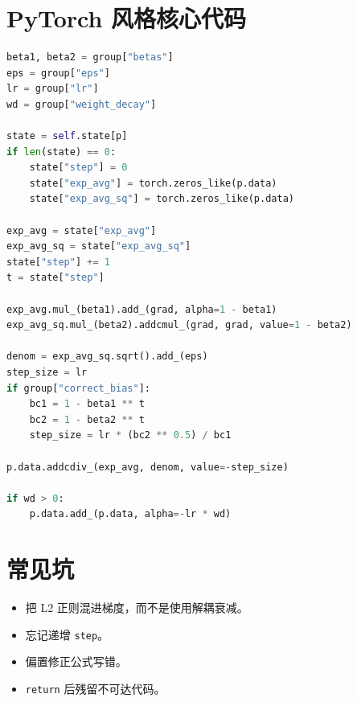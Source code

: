 \documentclass[11pt]{article}
\begin{document}
\section{PyTorch 风格核心代码}
\begin{lstlisting}[language=Python,basicstyle=\ttfamily\small]
beta1, beta2 = group["betas"]
eps = group["eps"]
lr = group["lr"]
wd = group["weight_decay"]

state = self.state[p]
if len(state) == 0:
    state["step"] = 0
    state["exp_avg"] = torch.zeros_like(p.data)
    state["exp_avg_sq"] = torch.zeros_like(p.data)

exp_avg = state["exp_avg"]
exp_avg_sq = state["exp_avg_sq"]
state["step"] += 1
t = state["step"]

exp_avg.mul_(beta1).add_(grad, alpha=1 - beta1)
exp_avg_sq.mul_(beta2).addcmul_(grad, grad, value=1 - beta2)

denom = exp_avg_sq.sqrt().add_(eps)
step_size = lr
if group["correct_bias"]:
    bc1 = 1 - beta1 ** t
    bc2 = 1 - beta2 ** t
    step_size = lr * (bc2 ** 0.5) / bc1

p.data.addcdiv_(exp_avg, denom, value=-step_size)

if wd > 0:
    p.data.add_(p.data, alpha=-lr * wd)
\end{lstlisting}

\section{常见坑}
\begin{itemize}
  \item 把 L2 正则混进梯度，而不是使用解耦衰减。
  \item 忘记递增 \texttt{step}。
  \item 偏置修正公式写错。
  \item \texttt{return} 后残留不可达代码。
\end{itemize}
\end{document}
